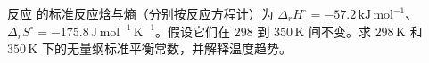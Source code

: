 反应  的标准反应焓与熵（分别按反应方程计）为 $\Delta_rH^\circ=-57.2\,\mathrm{kJ\,mol^{-1}}$、$\Delta_rS^\circ=-175.8\,\mathrm{J\,mol^{-1}\,K^{-1}}$。假设它们在 $298$ 到 $350\,\mathrm K$ 间不变。求 $298\,\mathrm K$ 和 $350\,\mathrm K$ 下的无量纲标准平衡常数，并解释温度趋势。

